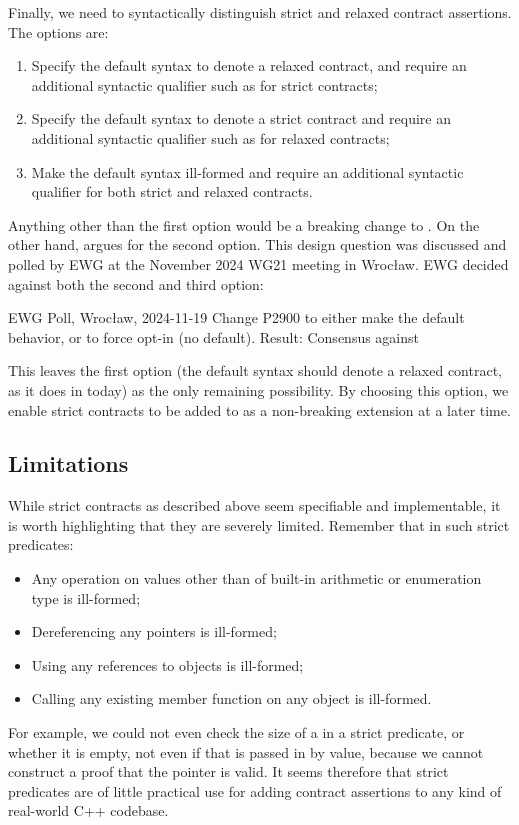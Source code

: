 Finally, we need to syntactically distinguish strict and relaxed contract assertions. The options are:
\begin{enumerate}
\item Specify the default syntax  to denote a relaxed contract, and require an additional syntactic qualifier such as  for strict contracts; 
\item Specify the default syntax  to denote a strict contract and require an additional syntactic qualifier such as  for relaxed contracts;
\item Make the default syntax ill-formed and require an additional syntactic qualifier for both strict and relaxed contracts.
\end{enumerate}
Anything other than the first option would be a breaking change to \cite{P2900R13}. On the other hand, \cite{P2680R1} argues for the second option. This design question was discussed and polled by EWG at the November 2024 WG21 meeting in Wroc{\l}aw. EWG decided against both the second and third option:
\vspace{2mm}
\begin{wgpoll}{{EWG Poll, Wroc{\l}aw, 2024-11-19}}
Change P2900 to either make  the default behavior, or to force opt-in (no default).
Result: Consensus against
\end{wgpoll}
\vspace{2mm}
This leaves the first option (the default syntax should denote a relaxed contract, as it does in \cite{P2900R13} today) as the only remaining possibility. By choosing this option, we enable strict contracts to be added to \cite{P2900R13} as a non-breaking extension at a later time.

\subsection{Limitations}

While strict contracts as described above seem specifiable and implementable, it is worth highlighting that they are severely limited. Remember that in such strict predicates:
\begin{itemize}
\item Any operation on values other than of built-in arithmetic or enumeration type is ill-formed;
\item Dereferencing any pointers is ill-formed;
\item Using any references to objects is ill-formed;
\item Calling any existing member function on any object is ill-formed.
\end{itemize}
For example, we could not even check the size of a  in a strict predicate, or whether it is empty, not even if that  is passed in by value, because we cannot construct a proof that the  pointer is valid. It seems therefore that strict predicates are of little practical use for adding contract assertions to any kind of real-world C++ codebase.

